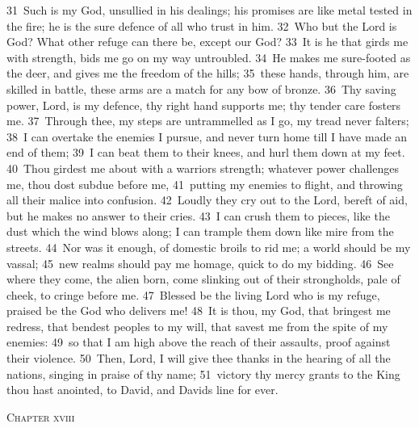 \documentclass[10pt]{book} %
\begin{document}
\textcolor{benred8}{31}~Such is my God, unsullied in his dealings; his promises are like metal tested in the fire; he is the sure defence of all who trust in him. \textcolor{benred8}{32}~Who but the Lord is God? What other refuge can there be, except our God? \textcolor{benred8}{33}~It is he that girds me with strength, bids me go on my way untroubled. \textcolor{benred8}{34}~He makes me sure-footed as the deer, and gives me the freedom of the hills; \textcolor{benred8}{35}~these hands, through him, are skilled in battle, these arms are a match for any bow of bronze. \textcolor{benred8}{36}~Thy saving power, Lord, is my defence, thy right hand supports me; thy tender care fosters me. \textcolor{benred8}{37}~Through thee, my steps are untrammelled as I go, my tread never falters; \textcolor{benred8}{38}~I can overtake the enemies I pursue, and never turn home till I have made an end of them; \textcolor{benred8}{39}~I can beat them to their knees, and hurl them down at my feet. \textcolor{benred8}{40}~Thou girdest me about with a warrior\textquotesingle s strength; whatever power challenges me, thou dost subdue before me, \textcolor{benred8}{41}~putting my enemies to flight, and throwing all their malice into confusion. \textcolor{benred8}{42}~Loudly they cry out to the Lord, bereft of aid, but he makes no answer to their cries. \textcolor{benred8}{43}~I can crush them to pieces, like the dust which the wind blows along; I can trample them down like mire from the streets.
\textcolor{benred8}{44}~Nor was it enough, of domestic broils to rid me; a world should be my vassal; \textcolor{benred8}{45}~new realms should pay me homage, quick to do my bidding. \textcolor{benred8}{46}~See where they come, the alien born, come slinking out of their strongholds, pale of cheek, to cringe before me. \textcolor{benred8}{47}~Blessed be the living Lord who is my refuge, praised be the God who delivers me! \textcolor{benred8}{48}~It is thou, my God, that bringest me redress, that bendest peoples to my will, that savest me from the spite of my enemies: \textcolor{benred8}{49}~so that I am high above the reach of their assaults, proof against their violence. \textcolor{benred8}{50}~Then, Lord, I will give thee thanks in the hearing of all the nations, singing in praise of thy name; \textcolor{benred8}{51}~victory thy mercy grants to the King thou hast anointed, to David, and David\textquotesingle s line for ever.
\begin{large}\begin{center}\textsc{Chapter xviii}\end{center}\end{large}
\end{document}
